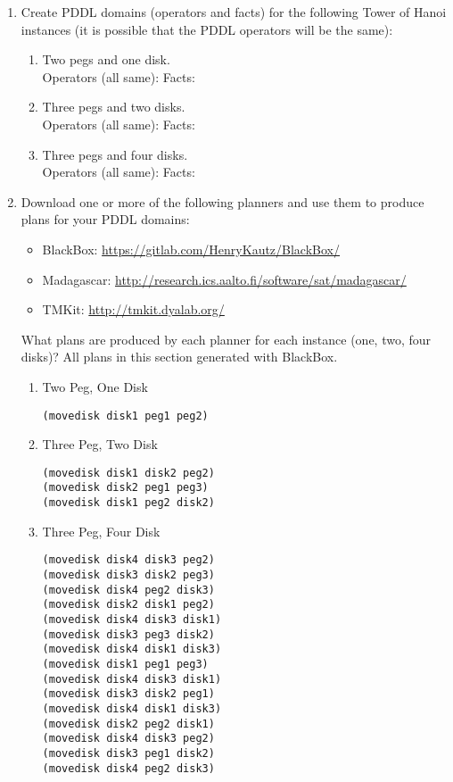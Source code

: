\documentclass[12pt,letterpaper]{ntdhw}
\begin{document}
\begin{enumerate}
  \item  Create PDDL domains (operators and facts) for the following Tower of
  Hanoi instances (it is possible that the PDDL operators will be the
  same):
  \begin{enumerate}
    \item Two pegs and one disk. \\
    Operators (all same):
    Facts:
    \item Three pegs and two disks. \\
    Operators (all same):
    Facts:
    \item Three pegs and four disks. \\
    Operators (all same):
    Facts:
  \end{enumerate}

  \item  Download one or more of the following planners and use them to
  produce plans for your PDDL domains:
  \begin{itemize}
    \item BlackBox:
    \url{https://gitlab.com/HenryKautz/BlackBox/}
    \item Madagascar:
    \url{http://research.ics.aalto.fi/software/sat/madagascar/}
    \item TMKit:
    \url{http://tmkit.dyalab.org/}
  \end{itemize}
  What plans are produced by each planner for each instance (one, two,
  four disks)?
    All plans in this section generated with BlackBox.
    \begin{enumerate}
        \item Two Peg, One Disk
        \begin{lstlisting}[language=pddl, style=pddlstyle,
  basicstyle=\scriptsize]
(movedisk disk1 peg1 peg2)
        \end{lstlisting}
        \item Three Peg, Two Disk
        \begin{lstlisting}[language=pddl, style=pddlstyle,
  basicstyle=\scriptsize]
(movedisk disk1 disk2 peg2)
(movedisk disk2 peg1 peg3)
(movedisk disk1 peg2 disk2)
        \end{lstlisting}
        \item Three Peg, Four Disk
        \begin{lstlisting}[language=pddl, style=pddlstyle,
  basicstyle=\scriptsize]
(movedisk disk4 disk3 peg2)
(movedisk disk3 disk2 peg3)
(movedisk disk4 peg2 disk3)
(movedisk disk2 disk1 peg2)
(movedisk disk4 disk3 disk1)
(movedisk disk3 peg3 disk2)
(movedisk disk4 disk1 disk3)
(movedisk disk1 peg1 peg3)
(movedisk disk4 disk3 disk1)
(movedisk disk3 disk2 peg1)
(movedisk disk4 disk1 disk3)
(movedisk disk2 peg2 disk1)
(movedisk disk4 disk3 peg2)
(movedisk disk3 peg1 disk2)
(movedisk disk4 peg2 disk3)
  \end{lstlisting}
    \end{enumerate}


\end{enumerate}
\end{document}

